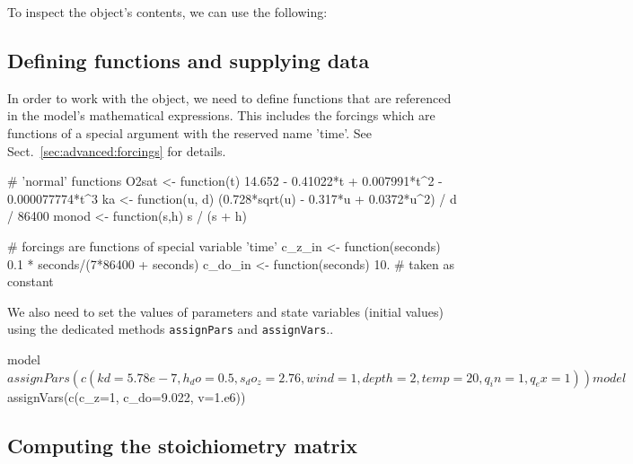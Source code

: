 \documentclass[onecolumn]{article}
\begin{document}
To inspect the object's contents, we can use the following:

\begin{Schunk}
\end{Schunk}

\subsection{Defining functions and supplying data}

In order to work with the object, we need to define functions that are referenced in the model's mathematical expressions. This includes the forcings which are functions of a special argument with the reserved name 'time'. See Sect.~\ref{sec:advanced:forcings} for details.

\begin{Schunk}
\begin{Sinput}
 # 'normal' functions
 O2sat <- function(t) {
   14.652 - 0.41022*t + 0.007991*t^2 - 0.000077774*t^3
 }
 ka <- function(u, d) {
   (0.728*sqrt(u) - 0.317*u + 0.0372*u^2) / d / 86400
 }
 monod <- function(s,h) {
   s / (s + h)
 }
\end{Sinput}
\end{Schunk}

\begin{Schunk}
\begin{Sinput}
 # forcings are functions of special variable 'time'
 c_z_in <- function(seconds) {
   0.1 * seconds/(7*86400 + seconds)
 }
 c_do_in <- function(seconds) {
   10.  # taken as constant
 }
\end{Sinput}
\end{Schunk}

We also need to set the values of parameters and state variables (initial values) using the dedicated methods \verb|assignPars| and \verb|assignVars|..

\begin{Schunk}
\begin{Sinput}
 model$assignPars(c(kd=5.78e-7, h_do=0.5, s_do_z=2.76,
  wind=1, depth=2, temp=20, q_in=1, q_ex=1))
 model$assignVars(c(c_z=1, c_do=9.022, v=1.e6))
\end{Sinput}
\end{Schunk}

\subsection{Computing the stoichiometry matrix}
\end{document}
